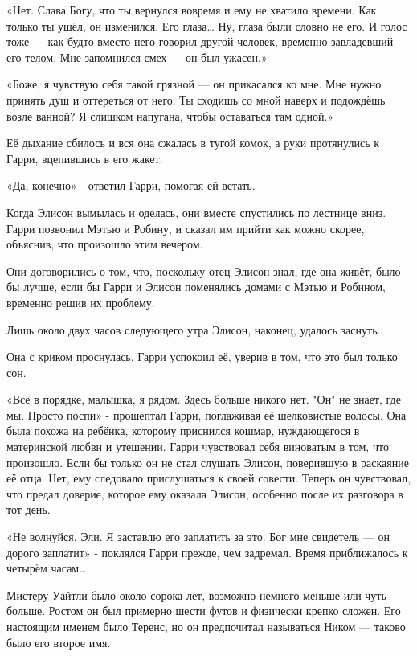 \documentclass[a4paper,12pt]{book}
\begin{document}
\par
«Нет. Слава Богу, что ты вернулся вовремя и ему не хватило времени. Как только ты ушёл, он изменился. Его глаза… Ну, глаза были словно не его. И голос тоже — как будто вместо него говорил другой человек, временно завладевший его телом. Мне запомнился смех — он был ужасен.»
\par
«Боже, я чувствую себя такой грязной — он прикасался ко мне. Мне нужно принять душ и оттереться от него. Ты сходишь со мной наверх и подождёшь возле ванной? Я слишком напугана, чтобы оставаться там одной.»
\par
Её дыхание сбилось и вся она сжалась в тугой комок, а руки протянулись к Гарри, вцепившись в его жакет.
\par
«Да, конечно» - ответил Гарри, помогая ей встать.\\
\par
Когда Элисон вымылась и оделась, они вместе спустились по лестнице вниз. Гарри позвонил Мэтью и Робину, и сказал им прийти как можно скорее, объяснив, что произошло этим вечером.
\par
Они договорились о том, что, поскольку отец Элисон знал, где она живёт, было бы лучше, если бы Гарри и Элисон поменялись домами с Мэтью и Робином, временно решив их проблему.
\par
Лишь около двух часов следующего утра Элисон, наконец, удалось заснуть.\\
\par
Она с криком проснулась. Гарри успокоил её, уверив в том, что это был только сон.
\par
«Всё в порядке, малышка, я рядом. Здесь больше никого нет. "Он" не знает, где мы. Просто поспи» - прошептал Гарри, поглаживая её шелковистые волосы. Она была похожа на ребёнка, которому приснился кошмар, нуждающегося в материнской любви и утешении. Гарри чувствовал себя виноватым в том, что произошло. Если бы только он не стал слушать Элисон, поверившую в раскаяние её отца. Нет, ему следовало прислушаться к своей совести. Теперь он чувствовал, что предал доверие, которое ему оказала Элисон, особенно после их разговора в тот день.
\par
«Не волнуйся, Эли. Я заставлю его заплатить за это. Бог мне свидетель — он дорого заплатит» - поклялся Гарри прежде, чем задремал. Время приближалось к четырём часам…\\
\par
Мистеру Уайтли было около сорока лет, возможно немного меньше или чуть больше. Ростом он был примерно шести футов и физически крепко сложен. Его настоящим именем было Теренс, но он предпочитал называться Ником — таково было его второе имя.
\end{document}

